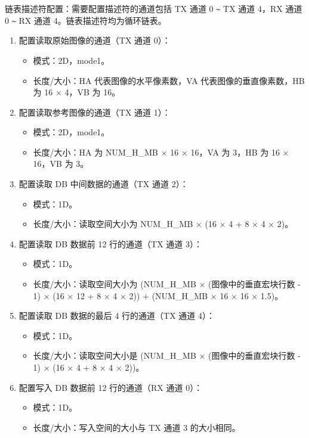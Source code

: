 \documentclass[main\_\_CN.tex]{subfiles}
\begin{document}
链表描述符配置：需要配置描述符的通道包括 TX 通道 0 \verb+~+ TX 通道 4，RX 通道 0 \verb+~+ RX 通道 4。链表描述符均为循环链表。
\begin{enumerate}
    \item 配置读取原始图像的通道（TX 通道 0）：
    \begin{itemize}
        \item 模式：2D，mode1。
        \item 长度/大小：HA 代表图像的水平像素数，VA 代表图像的垂直像素数，HB 为 16 × 4，VB 为 16。
    \end{itemize}
    \item 配置读取参考图像的通道（TX 通道 1）：
    \begin{itemize}
        \item 模式：2D，mode1。
        \item 长度/大小：HA 为 NUM\_H\_MB × 16 × 16，VA 为 3，HB 为 16 × 16，VB 为 3。
    \end{itemize}
    \item 配置读取 DB 中间数据的通道（TX 通道 2）：
    \begin{itemize}
        \item 模式：1D。
        \item 长度/大小：读取空间大小为 NUM\_H\_MB × (16 × 4 + 8 × 4 × 2)。
    \end{itemize}
    \item 配置读取 DB 数据前 12 行的通道（TX 通道 3）：
    \begin{itemize}
        \item 模式：1D。
        \item 长度/大小：读取空间大小为 (NUM\_H\_MB × (图像中的垂直宏块行数 - 1) × (16 × 12 + 8 × 4 × 2)) + (NUM\_H\_MB × 16 × 16 × 1.5)。
    \end{itemize}
    \item 配置读取 DB 数据的最后 4 行的通道（TX 通道 4）：
    \begin{itemize}
        \item 模式：1D。
        \item 长度/大小：读取空间大小是 (NUM\_H\_MB × (图像中的垂直宏块行数 - 1) × (16 × 4 + 8 × 4 × 2))。
    \end{itemize}
    \item 配置写入 DB 数据前 12 行的通道（RX 通道 0）：
    \begin{itemize}
        \item 模式：1D。
        \item 长度/大小：写入空间的大小与 TX 通道 3 的大小相同。

\end{itemize}
\end{enumerate}
\end{document}
